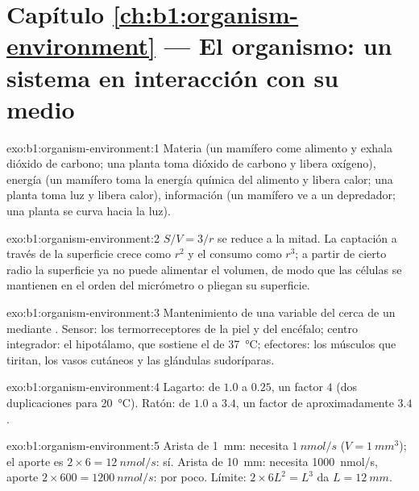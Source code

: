 \section*{Capítulo \ref{ch:b1:organism-environment} --- El organismo: un sistema en interacción con su medio}

\begin{solution}{exo:b1:organism-environment:1}
Materia (un mamífero come alimento y exhala dióxido de carbono; una planta
toma dióxido de carbono y libera oxígeno), energía (un mamífero toma la
energía química del alimento y libera calor; una planta toma luz y libera
calor), información (un mamífero ve a un depredador; una planta se curva
hacia la luz).
\end{solution}

\begin{solution}{exo:b1:organism-environment:2}
$S/V = 3/r$ se reduce a la mitad. La captación a través de la superficie
crece como $r^2$ y el consumo como $r^3$; a partir de cierto radio la
superficie ya no puede alimentar el volumen, de modo que las células se
mantienen en el orden del micrómetro o pliegan su superficie.
\end{solution}

\begin{solution}{exo:b1:organism-environment:3}
Mantenimiento de una variable del  cerca de un  mediante . Sensor: los termorreceptores
de la piel y del encéfalo; centro integrador: el hipotálamo, que sostiene el
 de \qty{37}{\celsius}; efectores: los músculos que
tiritan, los vasos cutáneos y las glándulas sudoríparas.
\end{solution}

\begin{solution}{exo:b1:organism-environment:4}
Lagarto: de $1.0$ a $0.25$, un factor $4$ (dos duplicaciones para
\qty{20}{\celsius}). Ratón: de $1.0$ a $3.4$, un factor de aproximadamente
$3.4$.
\end{solution}

\begin{solution}{exo:b1:organism-environment:5}
Arista de \qty{1}{mm}: necesita $\qty{1}{nmol/s}$ ($V = \qty{1}{mm^3}$); el
aporte es $2\times 6 = \qty{12}{nmol/s}$: sí. Arista de \qty{10}{mm}:
necesita \qty{1000}{nmol/s}, aporte $2\times 600 = \qty{1200}{nmol/s}$: por
poco. Límite: $2\times 6L^2 = L^3$ da $L = \qty{12}{mm}$.
\end{solution}

